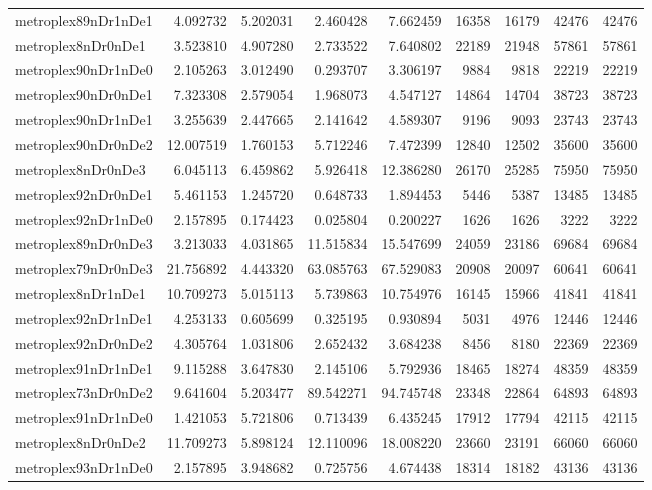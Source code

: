 \begin{longtable}{|l|r|r|r|r|r|r|r|r|}
metroplex89nDr1nDe1 & 4.092732 & 5.202031 & 2.460428 & 7.662459 & 16358 & 16179 & 42476 & 42476 \\
metroplex8nDr0nDe1 & 3.523810 & 4.907280 & 2.733522 & 7.640802 & 22189 & 21948 & 57861 & 57861 \\
metroplex90nDr1nDe0 & 2.105263 & 3.012490 & 0.293707 & 3.306197 & 9884 & 9818 & 22219 & 22219 \\
metroplex90nDr0nDe1 & 7.323308 & 2.579054 & 1.968073 & 4.547127 & 14864 & 14704 & 38723 & 38723 \\
metroplex90nDr1nDe1 & 3.255639 & 2.447665 & 2.141642 & 4.589307 & 9196 & 9093 & 23743 & 23743 \\
metroplex90nDr0nDe2 & 12.007519 & 1.760153 & 5.712246 & 7.472399 & 12840 & 12502 & 35600 & 35600 \\
metroplex8nDr0nDe3 & 6.045113 & 6.459862 & 5.926418 & 12.386280 & 26170 & 25285 & 75950 & 75950 \\
metroplex92nDr0nDe1 & 5.461153 & 1.245720 & 0.648733 & 1.894453 & 5446 & 5387 & 13485 & 13485 \\
metroplex92nDr1nDe0 & 2.157895 & 0.174423 & 0.025804 & 0.200227 & 1626 & 1626 & 3222 & 3222 \\
metroplex89nDr0nDe3 & 3.213033 & 4.031865 & 11.515834 & 15.547699 & 24059 & 23186 & 69684 & 69684 \\
metroplex79nDr0nDe3 & 21.756892 & 4.443320 & 63.085763 & 67.529083 & 20908 & 20097 & 60641 & 60641 \\
metroplex8nDr1nDe1 & 10.709273 & 5.015113 & 5.739863 & 10.754976 & 16145 & 15966 & 41841 & 41841 \\
metroplex92nDr1nDe1 & 4.253133 & 0.605699 & 0.325195 & 0.930894 & 5031 & 4976 & 12446 & 12446 \\
metroplex92nDr0nDe2 & 4.305764 & 1.031806 & 2.652432 & 3.684238 & 8456 & 8180 & 22369 & 22369 \\
metroplex91nDr1nDe1 & 9.115288 & 3.647830 & 2.145106 & 5.792936 & 18465 & 18274 & 48359 & 48359 \\
metroplex73nDr0nDe2 & 9.641604 & 5.203477 & 89.542271 & 94.745748 & 23348 & 22864 & 64893 & 64893 \\
metroplex91nDr1nDe0 & 1.421053 & 5.721806 & 0.713439 & 6.435245 & 17912 & 17794 & 42115 & 42115 \\
metroplex8nDr0nDe2 & 11.709273 & 5.898124 & 12.110096 & 18.008220 & 23660 & 23191 & 66060 & 66060 \\
metroplex93nDr1nDe0 & 2.157895 & 3.948682 & 0.725756 & 4.674438 & 18314 & 18182 & 43136 & 43136 \\

\end{longtable}
